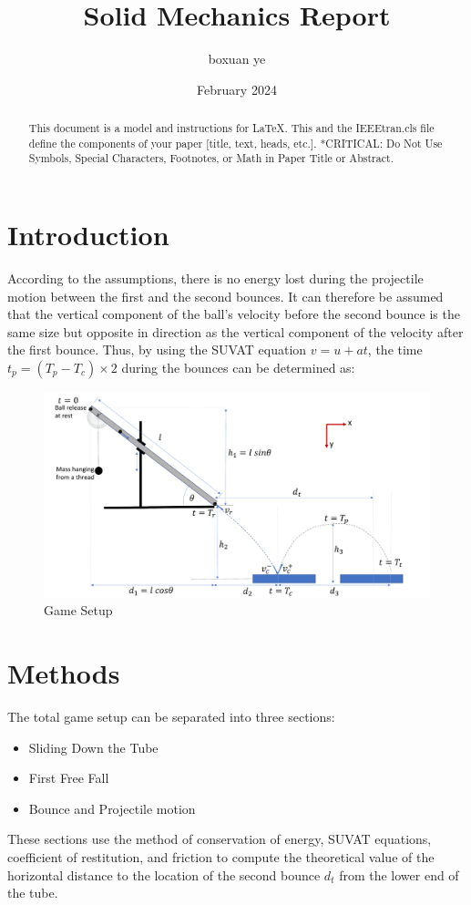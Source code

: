 \documentclass[conference]{IEEEtran}
\title{Solid Mechanics Report}
\author{boxuan ye}
\date{February 2024}
\begin{document}
\maketitle
\begin{abstract}
    This document is a model and instructions for \LaTeX.
    This and the IEEEtran.cls file define the components of your paper [title, text, heads, etc.]. *CRITICAL: Do Not Use Symbols, Special Characters, Footnotes, 
    or Math in Paper Title or Abstract.
\end{abstract}

\section{Introduction}
        According to the assumptions, there is no energy lost during the projectile motion between the first and the second bounces. It can therefore be assumed that the vertical component of the ball's velocity before the second bounce is the same size but opposite in direction as the vertical component of the velocity after the first bounce. Thus, by using the SUVAT equation $v = u + at$, the time $t_p = (T_p - T_c)\times2 $ during the bounces can be determined as:
\begin{figure}[H]
    \centering
    \includegraphics[width=1\linewidth]{Gamesetup.png}
    \caption{Game Setup}
    \label{fig:game_setup}
\end{figure}

\section{Methods}
    The total game setup can be separated into three sections:
    \begin{itemize}
        \item Sliding Down the Tube
        \item First Free Fall
        \item Bounce and Projectile motion
    \end{itemize}
    These sections use the method of conservation of energy, SUVAT equations, coefficient of restitution, and friction to compute the theoretical value of the horizontal distance to the location of the second bounce $d_t$ from the lower end of the tube.
    
\end{document}
